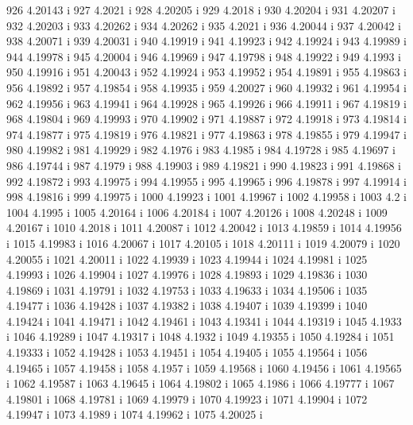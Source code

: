  926  4.20143  i
 927  4.2021  i
 928  4.20205  i
 929  4.2018  i
 930  4.20204  i
 931  4.20207  i
 932  4.20203  i
 933  4.20262  i
 934  4.20262  i
 935  4.2021  i
 936  4.20044  i
 937  4.20042  i
 938  4.20071  i
 939  4.20031  i
 940  4.19919  i
 941  4.19923  i
 942  4.19924  i
 943  4.19989  i
 944  4.19978  i
 945  4.20004  i
 946  4.19969  i
 947  4.19798  i
 948  4.19922  i
 949  4.1993  i
 950  4.19916  i
 951  4.20043  i
 952  4.19924  i
 953  4.19952  i
 954  4.19891  i
 955  4.19863  i
 956  4.19892  i
 957  4.19854  i
 958  4.19935  i
 959  4.20027  i
 960  4.19932  i
 961  4.19954  i
 962  4.19956  i
 963  4.19941  i
 964  4.19928  i
 965  4.19926  i
 966  4.19911  i
 967  4.19819  i
 968  4.19804  i
 969  4.19993  i
 970  4.19902  i
 971  4.19887  i
 972  4.19918  i
 973  4.19814  i
 974  4.19877  i
 975  4.19819  i
 976  4.19821  i
 977  4.19863  i
 978  4.19855  i
 979  4.19947  i
 980  4.19982  i
 981  4.19929  i
 982  4.1976  i
 983  4.1985  i
 984  4.19728  i
 985  4.19697  i
 986  4.19744  i
 987  4.1979  i
 988  4.19903  i
 989  4.19821  i
 990  4.19823  i
 991  4.19868  i
 992  4.19872  i
 993  4.19975  i
 994  4.19955  i
 995  4.19965  i
 996  4.19878  i
 997  4.19914  i
 998  4.19816  i
 999  4.19975  i
 1000  4.19923  i
 1001  4.19967  i
 1002  4.19958  i
 1003  4.2  i
 1004  4.1995  i
 1005  4.20164  i
 1006  4.20184  i
 1007  4.20126  i
 1008  4.20248  i
 1009  4.20167  i
 1010  4.2018  i
 1011  4.20087  i
 1012  4.20042  i
 1013  4.19859  i
 1014  4.19956  i
 1015  4.19983  i
 1016  4.20067  i
 1017  4.20105  i
 1018  4.20111  i
 1019  4.20079  i
 1020  4.20055  i
 1021  4.20011  i
 1022  4.19939  i
 1023  4.19944  i
 1024  4.19981  i
 1025  4.19993  i
 1026  4.19904  i
 1027  4.19976  i
 1028  4.19893  i
 1029  4.19836  i
 1030  4.19869  i
 1031  4.19791  i
 1032  4.19753  i
 1033  4.19633  i
 1034  4.19506  i
 1035  4.19477  i
 1036  4.19428  i
 1037  4.19382  i
 1038  4.19407  i
 1039  4.19399  i
 1040  4.19424  i
 1041  4.19471  i
 1042  4.19461  i
 1043  4.19341  i
 1044  4.19319  i
 1045  4.1933  i
 1046  4.19289  i
 1047  4.19317  i
 1048  4.1932  i
 1049  4.19355  i
 1050  4.19284  i
 1051  4.19333  i
 1052  4.19428  i
 1053  4.19451  i
 1054  4.19405  i
 1055  4.19564  i
 1056  4.19465  i
 1057  4.19458  i
 1058  4.1957  i
 1059  4.19568  i
 1060  4.19456  i
 1061  4.19565  i
 1062  4.19587  i
 1063  4.19645  i
 1064  4.19802  i
 1065  4.1986  i
 1066  4.19777  i
 1067  4.19801  i
 1068  4.19781  i
 1069  4.19979  i
 1070  4.19923  i
 1071  4.19904  i
 1072  4.19947  i
 1073  4.1989  i
 1074  4.19962  i
 1075  4.20025  i
